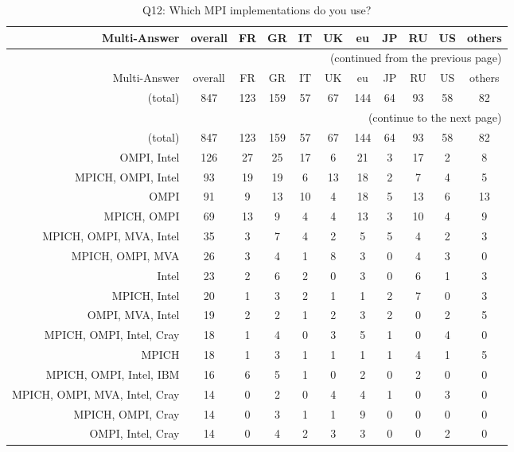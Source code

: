 \clearpage%
{\footnotesize\begin{landscape}%
\begin{longtable}[htb]{r|c|c|c|c|c|c|c|c|c|c}%
\caption{Q12: Which MPI implementations do you use?}%
\label{tab:Q12-mans} \\%
\hline%
Multi-Answer & overall & FR & GR & IT & UK & eu & JP & RU & US & others \\
 \hline%
\endfirsthead%
\multicolumn{11}{r}{(continued from the previous page)}\\%
\hline%
Multi-Answer & overall & FR & GR & IT & UK & eu & JP & RU & US & others \\
 \hline%
\endhead%
\hline%
(total) & 847 & 123 & 159 & 57 & 67 & 144 & 64 & 93 & 58 & 82 \\%
\hline%
\multicolumn{11}{r}{(continue to the next page)}\\%
\endfoot%
\hline%
(total) & 847 & 123 & 159 & 57 & 67 & 144 & 64 & 93 & 58 & 82 \\%
\hline%
\endlastfoot%
\hline%
{OMPI, Intel} & 126 & 27 & 25 & 17 & 6 & 21 & 3 & 17 & 2 & 8 \\%
{MPICH, OMPI, Intel} & 93 & 19 & 19 & 6 & 13 & 18 & 2 & 7 & 4 & 5 \\%
{OMPI} & 91 & 9 & 13 & 10 & 4 & 18 & 5 & 13 & 6 & 13 \\%
{MPICH, OMPI} & 69 & 13 & 9 & 4 & 4 & 13 & 3 & 10 & 4 & 9 \\%
{MPICH, OMPI, MVA, Intel} & 35 & 3 & 7 & 4 & 2 & 5 & 5 & 4 & 2 & 3 \\%
{MPICH, OMPI, MVA} & 26 & 3 & 4 & 1 & 8 & 3 & 0 & 4 & 3 & 0 \\%
{Intel} & 23 & 2 & 6 & 2 & 0 & 3 & 0 & 6 & 1 & 3 \\%
{MPICH, Intel} & 20 & 1 & 3 & 2 & 1 & 1 & 2 & 7 & 0 & 3 \\%
{OMPI, MVA, Intel} & 19 & 2 & 2 & 1 & 2 & 3 & 2 & 0 & 2 & 5 \\%
{MPICH, OMPI, Intel, Cray} & 18 & 1 & 4 & 0 & 3 & 5 & 1 & 0 & 4 & 0 \\%
{MPICH} & 18 & 1 & 3 & 1 & 1 & 1 & 1 & 4 & 1 & 5 \\%
{MPICH, OMPI, Intel, IBM} & 16 & 6 & 5 & 1 & 0 & 2 & 0 & 2 & 0 & 0 \\%
{MPICH, OMPI, MVA, Intel, Cray} & 14 & 0 & 2 & 0 & 4 & 4 & 1 & 0 & 3 & 0 \\%
{MPICH, OMPI, Cray} & 14 & 0 & 3 & 1 & 1 & 9 & 0 & 0 & 0 & 0 \\%
{OMPI, Intel, Cray} & 14 & 0 & 4 & 2 & 3 & 3 & 0 & 0 & 2 & 0 \\%

\end{longtable}
\end{landscape}}
